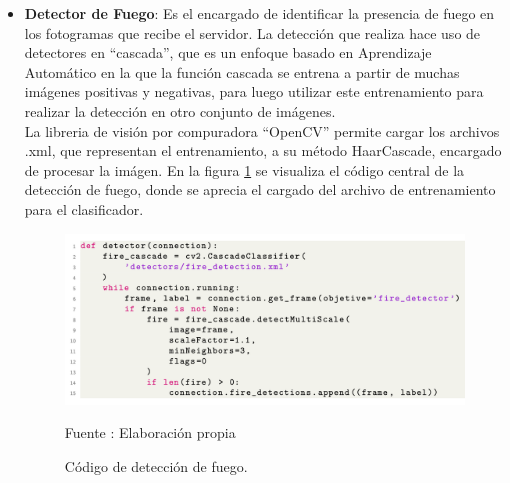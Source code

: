 \begin{itemize}
    \item \textbf{Detector de Fuego}:
    Es el encargado de identificar la presencia de fuego en los fotogramas que recibe el servidor. La detección que realiza hace uso de detectores en ``cascada'', que es un enfoque basado en Aprendizaje Automático en la que la función cascada se entrena a partir de muchas imágenes positivas y negativas, para luego utilizar este entrenamiento para realizar la detección en otro conjunto de imágenes.\\
    
    La libreria de visión por compuradora ``OpenCV'' permite cargar los archivos .xml, que representan el entrenamiento, a su método HaarCascade, encargado de procesar la imágen. En la figura \ref{fig:fire_detector} se visualiza el código central de la detección de fuego, donde se aprecia el cargado del archivo de entrenamiento para el clasificador.\\
    
    
    
    \begin{figure}[H]
        \begin{center}
            \includegraphics[width=17cm]{img/capitulo_5/fire_detector.png}
        \end{center}
        \begin{center}
            \caption{Código de detección de fuego.}
            Fuente : Elaboración propia
            \label{fig:fire_detector}
        \end{center}
    \end{figure}
    

\end{itemize}
